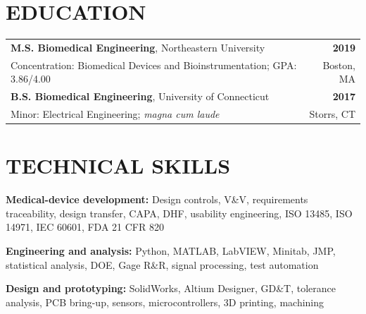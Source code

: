 \documentclass[10pt,letterpaper]{article}
\newcommand{\skillrow}[2]{%
  \textbf{\color{charcoal}#1:} #2\par
}
\begin{document}
\section*{EDUCATION}

\begin{tabularx}{\textwidth}{@{}Xr@{}}
  \textbf{M.S. Biomedical Engineering}, Northeastern University & \textbf{2019} \\
  Concentration: Biomedical Devices and Bioinstrumentation; GPA: 3.86/4.00 & Boston, MA \\
  \textbf{B.S. Biomedical Engineering}, University of Connecticut & \textbf{2017} \\
  Minor: Electrical Engineering; \textit{magna cum laude} & Storrs, CT
\end{tabularx}

\section*{TECHNICAL SKILLS}

\small
\skillrow{Medical-device development}{Design controls, V\&V, requirements traceability, design transfer, CAPA, DHF, usability engineering, ISO 13485, ISO 14971, IEC 60601, FDA 21 CFR 820}
\skillrow{Engineering and analysis}{Python, MATLAB, LabVIEW, Minitab, JMP, statistical analysis, DOE, Gage R\&R, signal processing, test automation}
\skillrow{Design and prototyping}{SolidWorks, Altium Designer, GD\&T, tolerance analysis, PCB bring-up, sensors, microcontrollers, 3D printing, machining}
\end{document}
